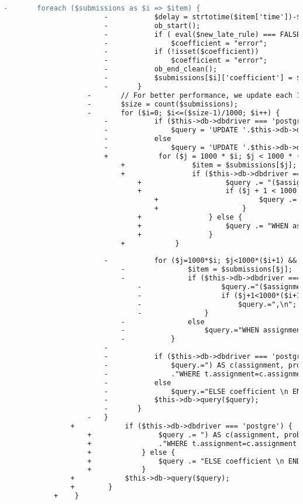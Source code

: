 \begin{lstlisting}[language=diff, caption=Perubahan pada kode Assignment\_model.php]
					-		foreach ($submissions as $i => $item) {
						-			$delay = strtotime($item['time'])-$finish_time;
						-			ob_start();
						-			if ( eval($new_late_rule) === FALSE )
						-				$coefficient = "error";
						-			if (!isset($coefficient))
						-				$coefficient = "error";
						-			ob_end_clean();
						-			$submissions[$i]['coefficient'] = $coefficient;
						-		}
					-		// For better performance, we update each 1000 rows in one SQL query
					-		$size = count($submissions);
					-		for ($i=0; $i<=($size-1)/1000; $i++) {
						-			if ($this->db->dbdriver === 'postgre')
						-				$query = 'UPDATE '.$this->db->dbprefix('submissions')." AS t SET coefficient = c.coeff FROM (values \n";
						-			else
						-				$query = 'UPDATE '.$this->db->dbprefix('submissions')." SET coefficient = CASE\n";
						+            for ($j = 1000 * $i; $j < 1000 * ($i + 1) && $j < $size; $j++) {
							+                $item = $submissions[$j];
							+                if ($this->db->dbdriver === 'postgre') {
								+                    $query .= "($assignment_id, {$item['problem']}, '{$item['username']}', {$item['submit_id']}, '{$item['coefficient']}')";
								+                    if ($j + 1 < 1000 * ($i + 1) && $j + 1 < $size) {
									+                        $query .= ",\n";
									+                    }
								+                } else {
								+                    $query .= "WHEN assignment='$assignment_id' AND problem='{$item['problem']}' AND username='{$item['username']}' AND submit_id='{$item['submit_id']}' THEN {$item['coefficient']}\n";
								+                }
							+            }
						
						-			for ($j=1000*$i; $j<1000*($i+1) && $j<$size; $j++){
							-				$item = $submissions[$j];
							-				if ($this->db->dbdriver === 'postgre'){
								-					$query.="($assignment_id, {$item['problem']}, '{$item['username']}', {$item['submit_id']}, '{$item['coefficient']}')";
								-					if ($j+1<1000*($i+1) && $j+1<$size )
								-						$query.=",\n";
								-				}
							-				else
							-					$query.="WHEN assignment='$assignment_id' AND problem='{$item['problem']}' AND username='{$item['username']}' AND submit_id='{$item['submit_id']}' THEN {$item['coefficient']}\n";
							-			}
						-
						-			if ($this->db->dbdriver === 'postgre')
						-				$query.=") AS c(assignment, problem, username, submit_id, coeff)\n"
						-				."WHERE t.assignment=c.assignment AND t.problem=c.problem AND t.username=c.username AND t.submit_id=c.submit_id;";
						-			else
						-				$query.="ELSE coefficient \n END \n WHERE assignment='$assignment_id';";
						-			$this->db->query($query);
						-		}
					-	}
				+            if ($this->db->dbdriver === 'postgre') {
					+                $query .= ") AS c(assignment, problem, username, submit_id, coeff)\n"
					+                ."WHERE t.assignment=c.assignment AND t.problem=c.problem AND t.username=c.username AND t.submit_id=c.submit_id;";
					+            } else {
					+                $query .= "ELSE coefficient \n END \n WHERE assignment='$assignment_id';";
					+            }
				+            $this->db->query($query);
				+        }
			+    }
		

\end{lstlisting}
